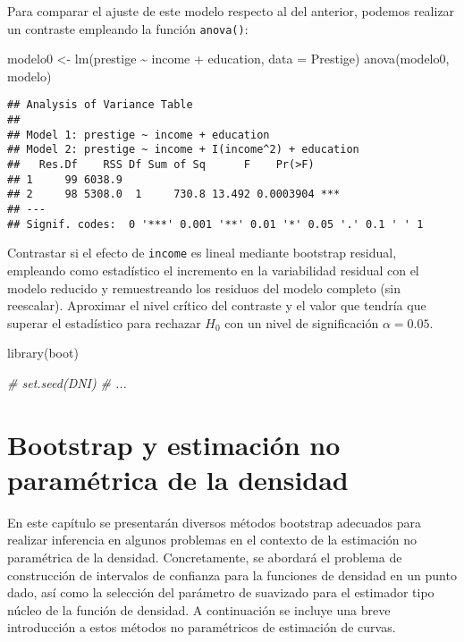\documentclass[
]{book}
\newenvironment{Shaded}{\begin{snugshade}}{\end{snugshade}}
\newcommand{\AttributeTok}[1]{\textcolor[rgb]{0.77,0.63,0.00}{#1}}
\newcommand{\CommentTok}[1]{\textcolor[rgb]{0.56,0.35,0.01}{\textit{#1}}}
\newcommand{\FunctionTok}[1]{\textcolor[rgb]{0.00,0.00,0.00}{#1}}
\newcommand{\NormalTok}[1]{#1}
\newcommand{\OtherTok}[1]{\textcolor[rgb]{0.56,0.35,0.01}{#1}}
\newcommand{\SpecialCharTok}[1]{\textcolor[rgb]{0.00,0.00,0.00}{#1}}
\theoremstyle{break}
\theoremstyle{definition}
\theoremstyle{definition}
\theoremstyle{definition}
\theoremstyle{definition}
\theoremstyle{remark}
\begin{document}
Para comparar el ajuste de este modelo respecto al del anterior, podemos
realizar un contraste empleando la función \texttt{anova()}:

\begin{Shaded}
\begin{Highlighting}[]
\NormalTok{modelo0 }\OtherTok{\textless{}{-}} \FunctionTok{lm}\NormalTok{(prestige }\SpecialCharTok{\textasciitilde{}}\NormalTok{ income }\SpecialCharTok{+}\NormalTok{ education, }\AttributeTok{data =}\NormalTok{ Prestige)}
\FunctionTok{anova}\NormalTok{(modelo0, modelo)}
\end{Highlighting}
\end{Shaded}

\begin{verbatim}
## Analysis of Variance Table
## 
## Model 1: prestige ~ income + education
## Model 2: prestige ~ income + I(income^2) + education
##   Res.Df    RSS Df Sum of Sq      F    Pr(>F)    
## 1     99 6038.9                                  
## 2     98 5308.0  1     730.8 13.492 0.0003904 ***
## ---
## Signif. codes:  0 '***' 0.001 '**' 0.01 '*' 0.05 '.' 0.1 ' ' 1
\end{verbatim}

Contrastar si el efecto de \texttt{income} es lineal mediante bootstrap residual,
empleando como estadístico el incremento en la variabilidad residual con el
modelo reducido y remuestreando los residuos del modelo completo (sin reescalar).
Aproximar el nivel crítico del contraste y el valor que tendría que superar el
estadístico para rechazar \(H_0\) con un nivel de significación \(\alpha = 0.05\).

\begin{Shaded}
\begin{Highlighting}[]
\FunctionTok{library}\NormalTok{(boot)}

\CommentTok{\# set.seed(DNI)}
\CommentTok{\# ...}
\end{Highlighting}
\end{Shaded}

\hypertarget{npden}{%
\chapter{Bootstrap y estimación no paramétrica de la densidad}\label{npden}}

En este capítulo se presentarán diversos métodos bootstrap adecuados
para realizar inferencia en algunos problemas en el contexto de la
estimación no paramétrica de la densidad. Concretamente, se abordará el
problema de construcción de intervalos de confianza para la funciones de
densidad en un punto dado, así como la selección del parámetro de
suavizado para el estimador tipo núcleo de la función de densidad. A
continuación se incluye una breve introducción a estos métodos no
paramétricos de estimación de curvas.
\end{document}
